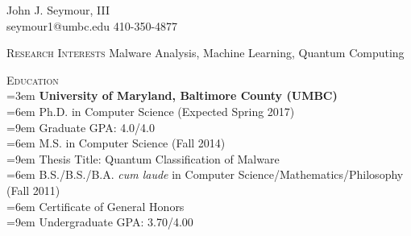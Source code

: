 \pagestyle{headings}
\newcommand{\tab}{\hspace*{3em}}
\newcommand{\atab}{\hangindent=3em \hangafter=0}
\newcommand{\btab}{\hangindent=6em \hangafter=0}
\newcommand{\ctab}{\hangindent=9em \hangafter=0}
\newcommand{\untab}{\hspace*{-3em}}

\newenvironment{my_list}
{\begin{itemize}
    \vspace{-4mm}
    \setlength{\itemsep}{0pt}
    \setlength{\itemindent}{6em}
    \setlength{\parskip}{0pt}
    \setlength{\parsep}{0pt}}
{\end{itemize}}

\oddsidemargin  -0.4in
\textwidth      7in
\topmargin  -0.5in
\headheight 0.0in
\headsep    0.0in
\textheight 11.0in


\centering
\LARGE \untab John J. Seymour, III\\
\normalsize
\medskip
\untab \untab seymour1@umbc.edu \tab \tab 410-350-4877\\
\medskip
\hline
\bigskip

\raggedright
\textsc{Research Interests} \tab Malware Analysis, Machine Learning, Quantum Computing\\
\medskip

\textsc{Education}\\
\atab \textbf{University of Maryland, Baltimore County (UMBC)}\\
\btab Ph.D. in Computer Science (Expected Spring 2017)\\
\ctab Graduate GPA: 4.0/4.0\\
\btab M.S. in Computer Science (Fall 2014)\\
\ctab Thesis Title: Quantum Classification of Malware\\
\btab B.S./B.S./B.A. \emph{cum laude} in Computer Science/Mathematics/Philosophy (Fall 2011)\\
\btab Certificate of General Honors\\
\ctab Undergraduate GPA: 3.70/4.00\\
\bigskip

